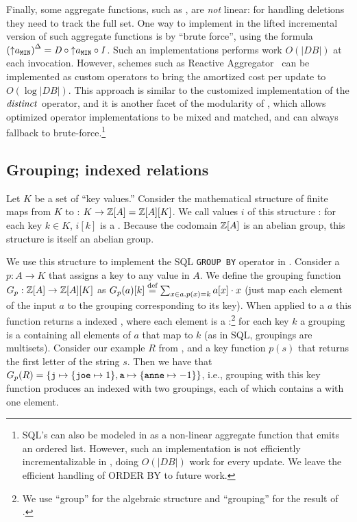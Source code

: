 Finally, some aggregate functions, such as , are 
\emph{not} linear: for handling deletions
they need to track the full set.  One way to implement in \dbsp the lifted
incremental version of such aggregate functions is 
by ``brute force'', using the formula ${({\uparrow}a_\texttt{MIN})}^{\Delta}
= \mathit{D} \circ {\uparrow}a_\texttt{MIN} \circ \mathit{I}$.  Such an implementations performs work
$O(|DB|)$ at each invocation.  However, schemes
such as Reactive Aggregator~\cite{tangwongsan-vldb15} can be implemented as custom \dbsp operators to bring
the amortized cost per update to $O(\log |DB|)$.  This approach is similar to the
customized implementation of the $\mathit{distinct}$ operator, and it is another facet of 
the modularity of \dbsp, which allows optimized operator implementations to be 
mixed and matched, and can always fallback to brute-force.\footnote{SQL's  can also be modeled in \dbsp as
a non-linear aggregate function that emits an ordered list.  However, 
such an implementation is not efficiently incrementalizable in \dbsp,
doing $O(|DB|)$ work for every update. 
We leave the efficient handling of ORDER BY to future work.}

\subsection{Grouping; indexed relations}\label{sec:grouping}

Let $K$ be a set of ``key values.''
Consider the mathematical structure of finite maps from $K$ 
to \zrs: $K \to \mathbb{Z}[A] = \mathbb{Z}[A][K]$.
We call values $i$ of this structure : for
each key $k \in K$, $i[k]$ is a \zr.  Because 
the codomain $\mathbb{Z}[A]$ is an abelian group, this structure is itself 
an abelian group.

We use this structure to implement the SQL \texttt{GROUP BY} operator in \dbsp.  
Consider a 
$p: A \to K$ that assigns a key to any value in $A$.  We define the grouping function
$G_p: \mathbb{Z}[A] \to \mathbb{Z}[A][K]$ as $G_p(a)[k] \stackrel{\textrm{\scriptsize def}}{=} \sum_{x \in a.p(x)=k}a[x] \cdot x$ 
(just map each element of the input $a$ to the \zr grouping corresponding to its key).
When applied to a \zr $a$ this function returns a indexed \zr, where each element 
is a :\footnote{We use
``group'' for the algebraic structure and ``grouping'' for the result of .} for each key $k$ a 
grouping is a \zr containing all elements of $a$ that map to $k$ 
(as in SQL, groupings are multisets).
Consider our example \zr $R$ from ,
and a key function $p(s)$ that returns the first letter of the string 
$s$. Then we have that $G_p(R) = \{ \mbox{\texttt{j}} \mapsto \{ \mbox{\texttt{joe}} 
\mapsto 1 \}, \mbox{\texttt{a}} \mapsto \{ \mbox{\texttt{anne}} \mapsto -1 \} \}$,
i.e., grouping with this key function produces an indexed \zr with two groupings, each 
of which contains a \zr with one element.

